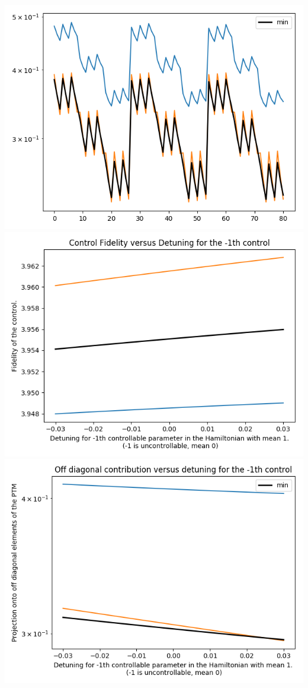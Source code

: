 \documentclass{article}
\begin{document}
\begin{center}
\includegraphics[scale=.9]{report_pickled_controls13/control_dpn_all}
\includegraphics[scale=.9]{control_fid_0}
\includegraphics[scale=.9]{off_diag_0}

\end{center}
\end{document}
